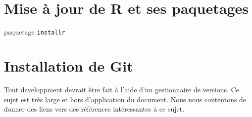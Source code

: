 \section{Mise à jour de R et ses paquetages}
paquetage \texttt{installr}
% 
%
% 
%

\section{Installation de Git}
Tout developpment devrait être fait à l'aide d'un gestionnaire de versions. Ce sujet est très large et hors d'application du document. Nous nous contentons de donner des liens vers des références intéressantes à ce sujet.
